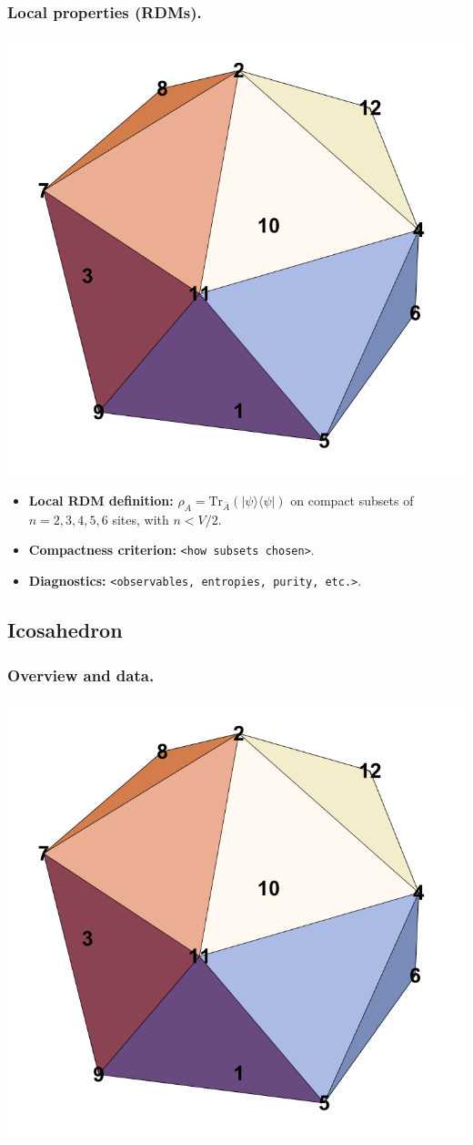 \documentclass[11pt,a4paper]{article}
\begin{document}
\subsubsection*{Local properties (RDMs).}
\begin{center}
  \includegraphics[width=.6\linewidth]{icosahedron}
\end{center}

\begin{itemize}[leftmargin=1.5em]
  \item \textbf{Local RDM definition:} $\rho_A=\mathrm{Tr}_{\bar A}(|\psi\rangle\langle\psi|)$ on compact subsets of $n=2,3,4,5,6$ sites, with $n < V/2$.
  \item \textbf{Compactness criterion:} \texttt{<how subsets chosen>}.
  \item \textbf{Diagnostics:} \texttt{<observables, entropies, purity, etc.>}.
\end{itemize}


\subsection*{Icosahedron}

\subsubsection*{Overview and data.}
\begin{center}
  \includegraphics[width=.6\linewidth]{icosahedron}
\end{center}
\end{document}
